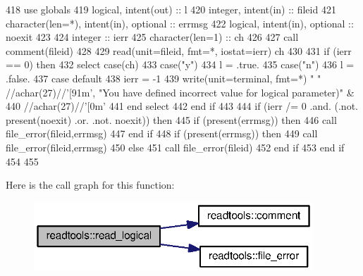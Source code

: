 \begin{DoxyCode}
418       \textcolor{keywordtype}{use }globals
419       \textcolor{keywordtype}{logical}, \textcolor{keywordtype}{intent(out)} :: l
420       \textcolor{keywordtype}{integer}, \textcolor{keywordtype}{intent(in)} :: fileid
421       \textcolor{keywordtype}{character(len=*)}, \textcolor{keywordtype}{intent(in)}, \textcolor{keywordtype}{optional} :: errmsg
422       \textcolor{keywordtype}{logical}, \textcolor{keywordtype}{intent(in)}, \textcolor{keywordtype}{optional} :: noexit
423 
424       \textcolor{keywordtype}{integer} :: ierr
425       \textcolor{keywordtype}{character(len=1)} :: ch
426       
427       \textcolor{keyword}{call }comment(fileid)
428       
429       \textcolor{keyword}{read}(unit=fileid, fmt=*, iostat=ierr) ch
430 
431       \textcolor{keywordflow}{if} (ierr == 0) \textcolor{keywordflow}{then} 
432         \textcolor{keywordflow}{select case}(ch)
433           \textcolor{keywordflow}{case}(\textcolor{stringliteral}{"y"})
434             l = .true.
435           \textcolor{keywordflow}{case}(\textcolor{stringliteral}{"n"})
436             l = .false.
437 \textcolor{keywordflow}{          case default}
438             ierr = -1
439             \textcolor{keyword}{write}(unit=terminal, fmt=*) \textcolor{stringliteral}{" "} //achar(27)//\textcolor{stringliteral}{'[91m'}, \textcolor{stringliteral}{"You have defined incorrect value for
       logical parameter)"}\textcolor{comment}{ &}
440 \textcolor{comment}{             //achar(27)//}\textcolor{stringliteral}{'[0m'}
441 \textcolor{keywordflow}{         end select}
442 \textcolor{keywordflow}{       end if}
443       
444       \textcolor{keywordflow}{if} (ierr /= 0 .and. (.not. \textcolor{keyword}{present}(noexit) .or. .not. noexit)) \textcolor{keywordflow}{then}
445         \textcolor{keywordflow}{if} (\textcolor{keyword}{present}(errmsg)) \textcolor{keywordflow}{then}
446           \textcolor{keyword}{call }file_error(fileid,errmsg)
447 \textcolor{keywordflow}{        end if}
448         \textcolor{keywordflow}{if} (\textcolor{keyword}{present}(errmsg)) \textcolor{keywordflow}{then}
449           \textcolor{keyword}{call }file_error(fileid,errmsg)
450         \textcolor{keywordflow}{else}
451           \textcolor{keyword}{call }file_error(fileid)
452 \textcolor{keywordflow}{        end if}
453 \textcolor{keywordflow}{      end if}
454       
455       
\end{DoxyCode}


Here is the call graph for this function\+:\nopagebreak
\begin{figure}[H]
\begin{center}
\leavevmode
\includegraphics[width=297pt]{namespacereadtools_a13e66cd8958ea07c3fb41f4dc80556c7_cgraph}
\end{center}
\end{figure}


